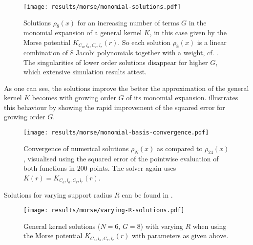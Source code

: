 \begin{figure}[H]
  \centering
  \texttt{[image: results/morse/monomial-solutions.pdf]}
  \caption[General kernel solutions with varying $G$]{Solutions $\rho_8(x)$ for an increasing number of terms $G$ in the monomial expansion of a general kernel $K$, in this case given by the Morse potential $K_{C_a, l_a, C_r, l_r}(r)$. So each solution $\rho_8(x)$ is a linear combination of $8$ Jacobi polynomials together with a weight, cf. . The singularities of lower order solutions disappear for higher $G$, which extensive simulation results attest.}
  \label{fig:monomial-solutions}
\end{figure}

As one can see, the solutions improve the better the approximation of the general kernel $K$ becomes with growing order $G$ of its monomial expansion.
 illustrates this behaviour by showing the rapid improvement of the squared error for growing order $G$.

\begin{figure}[H]
  \centering
  \texttt{[image: results/morse/monomial-basis-convergence.pdf]}
  \caption[Step-by-step convergence of solutions when increasing the degree of the monomial]{
    Convergence of numerical solutions $\rho_N(x)$ as compared to $\rho_{24}(x)$, visualised using the squared error of the pointwise evaluation of both functions in $200$ points.
    The solver again uses $K(r) = K_{C_a, l_a, C_r, l_r}(r)$.
  }
  \label{fig:monomial-basis-convergence}
\end{figure}

Solutions for varying support radius $R$ can be found in .

\begin{figure}[H]
  \centering
  \texttt{[image: results/morse/varying-R-solutions.pdf]}
  \caption[Solutions with varying $R$]{General kernel solutions ($N = 6$, $G = 8$) with varying $R$ when using the Morse potential $K_{C_a, l_a, C_r, l_r}(r)$ with parameters as given above.}
  \label{fig:varying-R-solutions}
\end{figure}
